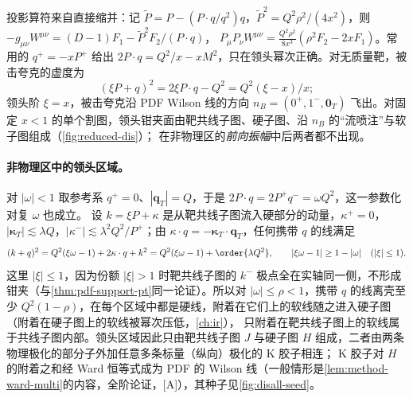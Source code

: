 \noindent
投影算符来自直接缩并：记 $\tilde P=P-(P\cdot q/q^2)q$，$\tilde P^2=Q^2\rho^2/(4x^2)$，则 $-g_{\mu\nu}W^{\mu\nu}=(D-1)F_1-\tilde P^2F_2/(P\cdot q)$，
$P_\mu P_\nu W^{\mu\nu}=\frac{Q^2\rho^2}{8x^3}(\rho^2F_2-2xF_1)$。常用的 $q^+=-xP^+$ 给出 $2P\cdot q=Q^2/x-xM^2$，只在领头幂次正确。对无质量靶，被击夸克的虚度为
\begin{equation}\label{eq:disall-current-virtuality}
(\xi P+q)^2=2\xi P\cdot q-Q^2=Q^2(\xi-x)/x;
\end{equation}
领头阶 $\xi=x$，被击夸克沿 PDF Wilson 线的方向 $n_B=(0^+,1^-,\mathbf 0_T)$ 飞出。对固定 $x<1$ 的单个割图，领头钳夹面由靶共线子图、硬子图、沿 $n_B$ 的“流喷注”与软子图组成（\cref{fig:reduced-dis}）；
在非物理区的\emph{前向振幅}中后两者都不出现。

\paragraph{非物理区中的领头区域。}
对 $|\omega|<1$ 取参考系 $q^+=0$、$|\mathbf q_T|=Q$，于是 $2P\cdot q=2P^+q^-=\omega Q^2$，这一参数化对复 $\omega$ 也成立。
设 $k=\xi P+\kappa$ 是从靶共线子图流入硬部分的动量，$\kappa^+=0$，$|\boldsymbol\kappa_T|\lesssim\lambda Q$，$|\kappa^-|\lesssim\lambda^2Q^2/P^+$；由 $\kappa\cdot q=-\boldsymbol\kappa_T\cdot\mathbf q_T$，任何携带 $q$ 的线满足
\begin{equation}\label{eq:disall-unphysical-offshell}
(k+q)^2=Q^2(\xi\omega-1)+2\kappa\cdot q+k^2=Q^2(\xi\omega-1)+\order{\lambda Q^2},\qquad |\xi\omega-1|\ge1-|\omega|\quad(|\xi|\le1).
\end{equation}
这里 $|\xi|\le1$，因为份额 $|\xi|>1$ 时靶共线子图的 $k^-$ 极点全在实轴同一侧，不形成钳夹（与\cref{thm:pdf-support-pt}同一论证）。所以对 $|\omega|\le\rho<1$，携带 $q$ 的线离壳至少 $Q^2(1-\rho)$，在每个区域中都是硬线，附着在它们上的软线随之进入硬子图（附着在硬子图上的软线被幂次压低，\cref{ch:ir}），
只附着在靶共线子图上的软线属于共线子图内部。领头区域因此只由靶共线子图 $J$ 与硬子图 $H$ 组成，二者由两条物理极化的部分子外加任意多条标量（纵向）极化的 K 胶子相连；
K 胶子对 $H$ 的附着之和经 Ward 恒等式成为 PDF 的 Wilson 线（一般情形是\cref{lem:method-ward-multi}的内容，全阶论证，[A]），其种子见\cref{fig:disall-seed}。

